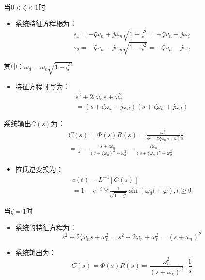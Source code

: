 \begin{frame}
\begin{block}{当$0<\zeta<1$时}
\begin{itemize}
\item<+-> 系统特征方程根为：
\[s_1=-\zeta\omega_n+j\omega_n\sqrt{1-\zeta^2}=-\zeta\omega_n+j\omega_d\]
\[s_2=-\zeta\omega_n-j\omega_n\sqrt{1-\zeta^2}=-\zeta\omega_n-j\omega_d\]
\end{itemize}
其中：$\omega_d=\omega_n\sqrt{1-\zeta^2}$
\end{block}
\end{frame}
\begin{frame}
\begin{block}{}
\begin{itemize}
\item<+-> 特征方程可写为：
\begin{eqnarray*}
s^2+2\zeta\omega_ns+\omega_n^2\\
=(s+\zeta\omega_n-j\omega_d)(s+\zeta\omega_n+j\omega_d)
\end{eqnarray*}
\end{itemize}
\end{block}
\end{frame}
\begin{frame}
\begin{block}{}
系统输出$C(s)$为：
\begin{eqnarray*}
C(s)=\Phi(s)R(s)=\frac{\omega_n^2}{s^2+2\zeta\omega_ns+\omega_n^2}\frac{1}{s}\\
=\frac{1}{s}-\frac{s+\zeta\omega_n}{(s+\zeta\omega_n)^2+\omega_d^2}-\frac{\zeta\omega_n}{(s+\zeta\omega_n)^2+\omega_d^2}
\end{eqnarray*}
\end{block}
\end{frame}
\begin{frame}
\begin{block}{}
\begin{itemize}
\item<+-> 拉氏逆变换为：
\begin{eqnarray*}
c(t)=L^{-1}[C(s)]\\
=1-e^{-\zeta\omega_nt}\frac{1}{\sqrt{1-\zeta^2}}\sin(\omega_dt+\varphi),t\geq 0
\end{eqnarray*}
\end{itemize}
\end{block}
\end{frame}
\begin{frame}
\begin{block}{当$\zeta=1$时}
\begin{itemize}
\item<+-> 系统的特征方程为：
\[s^2+2\zeta\omega_ns+\omega_n^2=s^2+2\omega_n+\omega_n^2=(s+\omega_n)^2\]
\item<+-> 系统输出为：
\[C(s)=\Phi(s)R(s)=\frac{\omega_n^2}{(s+\omega_n)^2}\cdot\frac{1}{s}\]
\end{itemize}
\end{block}
\end{frame}
